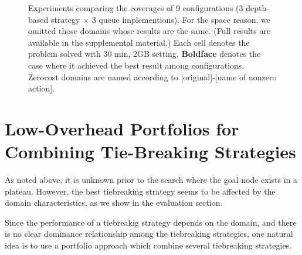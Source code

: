 

\begin{figure}[htb]
 \centering
 
 \caption{Experiments
 comparing the coverages of 9 configurations (3 depth-based strategy
 $\times$ 3 queue implementions). For the space reason, we omitted those
 domains whose results are the same. (Full results are available in the
 supplemental material.) Each cell denotes the problem solved with 30
 min, 2GB setting. \textbf{Boldface} denotes the case where it achieved
 the best result among configurations. Zerocost domains are named
 according to [original]-[name of nonzero action].}
 \label{depth}
\end{figure}

%  

\section{Low-Overhead Portfolios for Combining Tie-Breaking Strategies}

As noted above, it is unknown prior to the search where the goal node
exists in a plateau.
However, the best tiebreaking strategy seems to be affected by the domain
characteristics, as we show in the evaluation section.

Since the performance of a tiebreakig strategy depends on the domain, and there is no clear dominance relationship among the tiebreaking strategies, one natural 
idea is to use a portfolio approach which combine several tiebreaking strategies.

